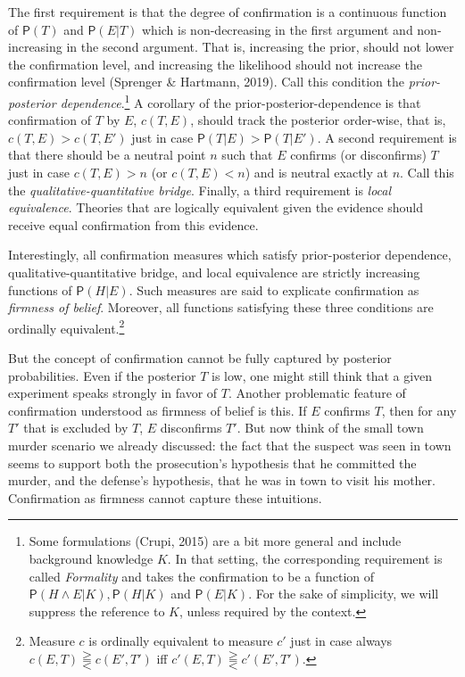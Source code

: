 \documentclass[
  10pt,
  dvipsnames,enabledeprecatedfontcommands]{scrartcl}
\newcommand{\et}{\wedge}
\newcommand{\pr}[1]{\mathsf{P}(#1)}
\begin{document}
The first requirement is that the degree of confirmation is a continuous
function of \(\pr{T}\) and \(\pr{E\vert T}\) which is non-decreasing in
the first argument and non-increasing in the second argument. That is,
increasing the prior, should not lower the confirmation level, and
increasing the likelihood should not increase the confirmation level
(Sprenger \& Hartmann, 2019). Call this condition the
\emph{prior-posterior dependence}.\footnote{Some formulations (Crupi,
  2015) are a bit more general and include background knowledge \(K\).
  In that setting, the corresponding requirement is called
  \emph{Formality} and takes the confirmation to be a function of
  \(\pr{H \et E \vert K}, \pr{H\vert K}\) and \(\pr{E\vert K}\). For the
  sake of simplicity, we will suppress the reference to \(K\), unless
  required by the context.} A corollary of the
prior-posterior-dependence is that confirmation of \(T\) by \(E\),
\(c(T,E)\), should track the posterior order-wise, that is,
\(c(T,E)>c(T,E')\) just in case \(\pr{T\vert E} > \pr{T\vert E'}\). A
second requirement is that there should be a neutral point \(n\) such
that \(E\) confirms (or disconfirms) \(T\) just in case \(c(T,E)>n\) (or
\(c(T,E)<n\)) and is neutral exactly at \(n\). Call this the
\emph{qualitative-quantitative bridge}. Finally, a third requirement is
\emph{local equivalence}. Theories that are logically equivalent given
the evidence should receive equal confirmation from this evidence.

Interestingly, all confirmation measures which satisfy prior-posterior
dependence, qualitative-quantitative bridge, and local equivalence are
strictly increasing functions of \(\pr{H \vert E}\). Such measures are
said to explicate confirmation as \emph{firmness of belief}. Moreover,
all functions satisfying these three conditions are ordinally
equivalent.\footnote{Measure $c$ is ordinally equivalent to measure $c'$ just in case always $c(E , T) \gtreqqless c(E', T')$ iff $c'(E , T) \gtreqqless c'(E' , T')$.}

But the concept of confirmation cannot be fully captured by posterior
probabilities. Even if the posterior \(T\) is low, one might still think
that a given experiment speaks strongly in favor of \(T\). Another
problematic feature of confirmation understood as firmness of belief is
this. If \(E\) confirms \(T\), then for any \(T'\) that is excluded by
\(T\), \(E\) disconfirms \(T'\). But now think of the small town murder
scenario we already discussed: the fact that the suspect was seen in
town seems to support both the prosecution's hypothesis that he
committed the murder, and the defense's hypothesis, that he was in town
to visit his mother. Confirmation as firmness cannot capture these
intuitions.
\end{document}
